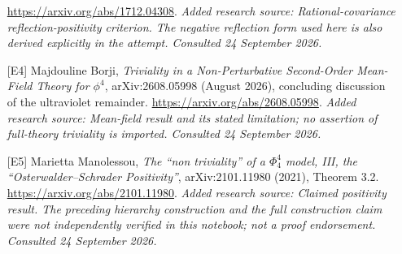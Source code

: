 \documentclass[11pt]{article}
\begin{document}
\begin{itemize}
\url{https://arxiv.org/abs/1712.04308}.
{\small\textit{Added research source: Rational-covariance reflection-positivity criterion. The negative reflection form used here is also derived explicitly in the attempt. Consulted 24 September 2026.}}
\item[\textnormal{[E4]}]\hypertarget{extra:51:4}{} Majdouline Borji, \emph{Triviality in a Non-Perturbative Second-Order Mean-Field Theory for $\phi^4$}, arXiv:2608.05998 (August 2026), concluding discussion of the ultraviolet remainder.
\url{https://arxiv.org/abs/2608.05998}.
{\small\textit{Added research source: Mean-field result and its stated limitation; no assertion of full-theory triviality is imported. Consulted 24 September 2026.}}
\item[\textnormal{[E5]}]\hypertarget{extra:51:5}{} Marietta Manolessou, \emph{The ``non triviality'' of a $\Phi^4_4$ model, III, the ``Osterwalder--Schrader Positivity''}, arXiv:2101.11980 (2021), Theorem 3.2.
\url{https://arxiv.org/abs/2101.11980}.
{\small\textit{Added research source: Claimed positivity result. The preceding hierarchy construction and the full construction claim were not independently verified in this notebook; not a proof endorsement. Consulted 24 September 2026.}}
\end{itemize}
\end{document}

